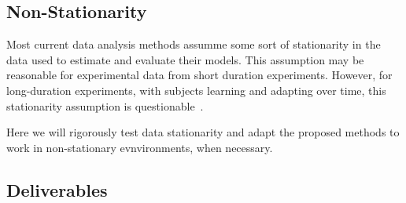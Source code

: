 
\subsection{Non-Stationarity}

Most current data analysis methods assumme some sort of stationarity in the
data used to estimate and evaluate their models. This assumption may be
reasonable for experimental data from short duration experiments. However, for
long-duration experiments, with subjects learning and adapting over time, this
stationarity assumption is questionable~\citep{ditzlerEtAl15}.

Here we will rigorously test data stationarity and adapt the proposed methods
to work in non-stationary evnvironments, when necessary.

\subsection{Deliverables}

